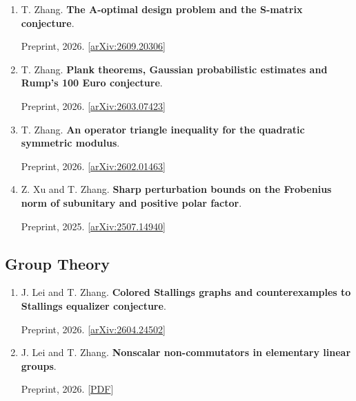 \documentclass[11pt,letterpaper]{article}
\begin{document}
\begin{enumerate}[resume*=preprints]
\raggedright

\item \begin{minipage}[t]{\linewidth}\raggedright T. Zhang. \textbf{The A-optimal design problem and the S-matrix conjecture}.\par Preprint, 2026. [\href{https://arxiv.org/abs/2609.20306}{arXiv:2609.20306}]\end{minipage}

\item \begin{minipage}[t]{\linewidth}\raggedright T. Zhang. \textbf{Plank theorems, Gaussian probabilistic estimates and Rump's 100 Euro conjecture}.\par Preprint, 2026. [\href{https://arxiv.org/abs/2603.07423}{arXiv:2603.07423}]\end{minipage}

\item \begin{minipage}[t]{\linewidth}\raggedright T. Zhang. \textbf{An operator triangle inequality for the quadratic symmetric modulus}.\par Preprint, 2026. [\href{https://arxiv.org/abs/2602.01463}{arXiv:2602.01463}]\end{minipage}

\item \begin{minipage}[t]{\linewidth}\raggedright Z. Xu and T. Zhang. \textbf{Sharp perturbation bounds on the Frobenius norm of subunitary and positive polar factor}.\par Preprint, 2025. [\href{https://arxiv.org/abs/2507.14940}{arXiv:2507.14940}]\end{minipage}

\end{enumerate}

\subsection{Group Theory}

\begin{enumerate}[resume*=preprints]
\raggedright

\item \begin{minipage}[t]{\linewidth}\raggedright J. Lei and T. Zhang. \textbf{Colored Stallings graphs and counterexamples to Stallings equalizer conjecture}.\par Preprint, 2026. [\href{https://arxiv.org/abs/2604.24502}{arXiv:2604.24502}]\end{minipage}

\item \begin{minipage}[t]{\linewidth}\raggedright J. Lei and T. Zhang. \textbf{Nonscalar non-commutators in elementary linear groups}.\par Preprint, 2026. [\href{https://zhangteng2000.github.io/files/MA7n.pdf}{PDF}]\end{minipage}

\end{enumerate}
\end{document}
